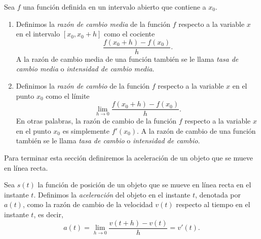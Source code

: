 \documentclass[12pt,a4paper]{book}
\begin{document}
    \begin{definicion}\label{def:47}
        Sea $f$
        una función definida en un intervalo abierto que contiene a $x_{0}$.
        \begin{enumerate}
            \item Definimos la \textit{razón de cambio media} de la función $f$ respecto a la variable
            $x$ en el intervalo $[x_{0},x_{0}+h]$ como el cociente
            \begin{equation*}
                \frac{f(x_{0}+h)-f(x_{0})}{h}.
            \end{equation*}
            A la razón de cambio media de una función también se le llama \textit{tasa de
            cambio media} o \textit{intensidad de cambio media}.
            \item Definimos la \textit{razón de cambio} de la función $f$ respecto a la variable $x$ en
            el punto $x_{0}$ como el límite
            \begin{equation*}
                \lim_{h\to 0}\frac{f(x_{0}+h)-f(x_{0})}{h}.
            \end{equation*}
            En otras palabras, la razón de cambio de la función $f$ respecto a la variable
            $x$ en el punto $x_{0}$ es simplemente $f'(x_{0})$. A la razón de cambio de una
            función también se le llama \textit{tasa de cambio} o \textit{intensidad de cambio}.
        \end{enumerate}
    \end{definicion}

    Para terminar esta sección definiremos la aceleración de un objeto que se
    mueve en línea recta.

    \begin{definicion}[Aceleración]\label{def:48}
        Sea $s(t)$ la función de posición de un objeto
        que se mueve en línea recta en el instante $t$. Definimos la \textit{aceleración} del
        objeto en el instante $t$, denotada por $a(t)$, como la razón de cambio de la
        velocidad $v(t)$ respecto al tiempo en el instante $t$, es decir,
        \begin{equation*}
            a(t)=\lim_{h\to 0}\frac{v(t+h)-v(t)}{h}=v'(t).
        \end{equation*}
    \end{definicion}
\end{document}
